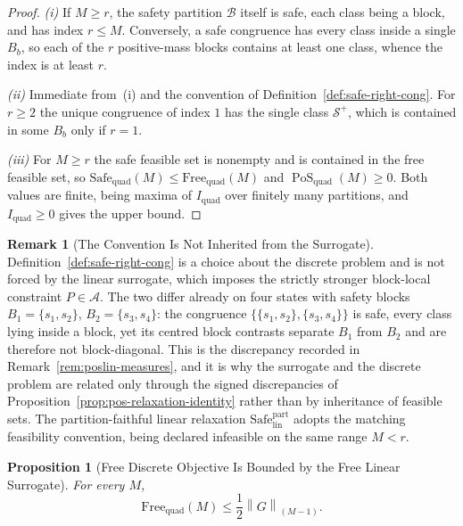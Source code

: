 \documentclass[12pt]{article}
\newtheorem{proposition}[theorem]{Proposition}
\theoremstyle{definition}
\newtheorem{remark}[theorem]{Remark}
\DeclareMathOperator{\PoS}{PoS}
\newcommand{\KyF}[2]{\left\|#1\right\|_{(#2)}}
\newcommand{\PoSquad}{\PoS_{\mathrm{quad}}}
\newcommand{\Splus}{\mathcal S^{+}}
\begin{document}
\begin{proof}
\emph{(i)} If $M\ge r$, the safety partition $\mathcal B$ itself is safe, each
class being a block, and has index $r\le M$.  Conversely, a safe congruence has
every class inside a single $B_b$, so each of the $r$ positive-mass blocks
contains at least one class, whence the index is at least $r$.

\emph{(ii)} Immediate from~(i) and the convention of
Definition~\ref{def:safe-right-cong}.  For $r\ge2$ the unique congruence of
index $1$ has the single class $\Splus$, which is contained in some $B_b$ only
if $r=1$.

\emph{(iii)} For $M\ge r$ the safe feasible set is nonempty and is contained in
the free feasible set, so
$\mathrm{Safe}_{\mathrm{quad}}(M)\le\mathrm{Free}_{\mathrm{quad}}(M)$ and
$\PoSquad(M)\ge0$.  Both values are finite, being maxima of
$I_{\mathrm{quad}}$ over finitely many partitions, and
$I_{\mathrm{quad}}\ge0$ gives the upper bound.
\end{proof}

\begin{remark}[The Convention Is Not Inherited from the Surrogate]
\label{rem:pos-convention-independent}
Definition~\ref{def:safe-right-cong} is a choice about the discrete problem and
is not forced by the linear surrogate, which imposes the strictly stronger
block-local constraint $P\in\mathcal A$.  The two differ already on four states
with safety blocks $B_1=\{s_1,s_2\}$, $B_2=\{s_3,s_4\}$: the congruence
$\{\{s_1,s_2\},\{s_3,s_4\}\}$ is safe, every class lying inside a block, yet its
centred block contrasts separate $B_1$ from $B_2$ and are therefore not
block-diagonal.  This is the discrepancy recorded in
Remark~\ref{rem:poslin-measures}, and it is why the surrogate and the discrete
problem are related only through the signed discrepancies of
Proposition~\ref{prop:pos-relaxation-identity} rather than by inheritance of
feasible sets.  The partition-faithful linear relaxation
$\mathrm{Safe}_{\mathrm{lin}}^{\mathrm{part}}$ adopts the matching feasibility
convention, being declared infeasible on the same range $M<r$.
\end{remark}

\begin{proposition}[Free Discrete Objective Is Bounded by the Free Linear Surrogate]
\label{prop:free-discrete-bound}
For every $M$,
\[
\mathrm{Free}_{\mathrm{quad}}(M)
\le
\frac12
\KyF{G}{M-1}.
\]
\end{proposition}
\end{document}

